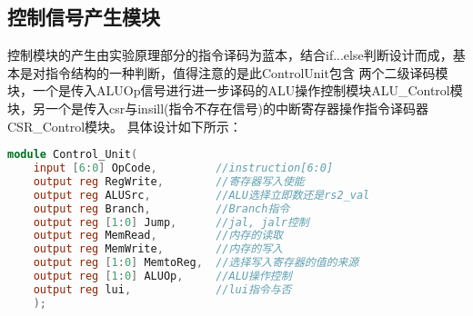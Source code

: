\subsection{控制信号产生模块}
控制模块的产生由实验原理部分的指令译码为蓝本，结合if...else判断设计而成，基本是对指令结构的一种判断，值得注意的是此ControlUnit包含
两个二级译码模块，一个是传入ALUOp信号进行进一步译码的ALU操作控制模块ALU\_Control模块，另一个是传入csr与insill(指令不存在信号)的中断寄存器操作指令译码器CSR\_Control模块。
具体设计如下所示：
\begin{lstlisting}[language = {verilog}]
module Control_Unit(
    input [6:0] OpCode,         //instruction[6:0]
    output reg RegWrite,        //寄存器写入使能
    output reg ALUSrc,          //ALU选择立即数还是rs2_val
    output reg Branch,          //Branch指令
    output reg [1:0] Jump,      //jal, jalr控制
    output reg MemRead,         //内存的读取
    output reg MemWrite,        //内存的写入
    output reg [1:0] MemtoReg,  //选择写入寄存器的值的来源
    output reg [1:0] ALUOp,     //ALU操作控制
    output reg lui,             //lui指令与否
    );
        

\end{lstlisting}
